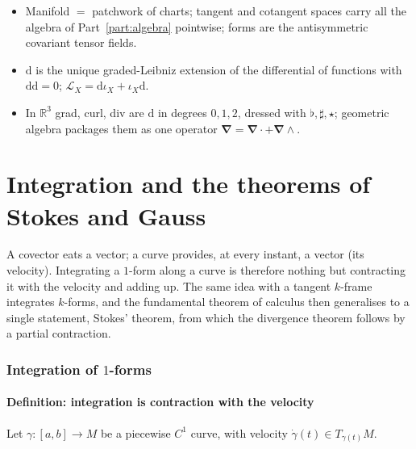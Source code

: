 \documentclass[11pt,a4paper]{article}
\numberwithin{equation}{section}
\theoremstyle{definition}
\theoremstyle{plain}
\newcommand{\R}{\mathbb{R}}
\newcommand{\dd}{\mathrm{d}}
\newcommand{\Lie}{\mathcal{L}}
\newcommand{\hodge}{\star}
\newcommand{\vd}{\boldsymbol{\nabla}}               %
\begin{document}
\begin{keypoints}[Part II]
\begin{itemize}
\item Manifold $=$ patchwork of charts; tangent and cotangent spaces carry all the algebra of Part~\ref{part:algebra} pointwise; forms are the antisymmetric covariant tensor fields.
\item $\dd$ is the unique graded-Leibniz extension of the differential of functions with $\dd\dd=0$; $\Lie_X=\dd\iota_X+\iota_X\dd$.
\item In $\R^3$ grad, curl, div are $\dd$ in degrees $0,1,2$, dressed with $\flat,\sharp,\hodge$; geometric algebra packages them as one operator $\vd=\vd\cdot+\vd\wedge$.
\end{itemize}
\end{keypoints}


\clearpage
\part{Integration and the theorems of Stokes and Gauss}\label{part:integration}

A covector eats a vector; a curve provides, at every instant, a vector (its velocity). Integrating a $1$-form along a curve is therefore
nothing but contracting it with the velocity and adding up. The same idea with a tangent $k$-frame integrates $k$-forms, and the
fundamental theorem of calculus then generalises to a single statement, Stokes' theorem, from which the divergence theorem follows by
a partial contraction.

\section{Integration of $1$-forms}\label{sec:int1}

\subsection{Definition: integration is contraction with the velocity}\label{sec:int1def}

Let $\gamma:[a,b]\to M$ be a piecewise $C^1$ curve, with velocity $\dot\gamma(t)\in T_{\gamma(t)}M$.
\end{document}
